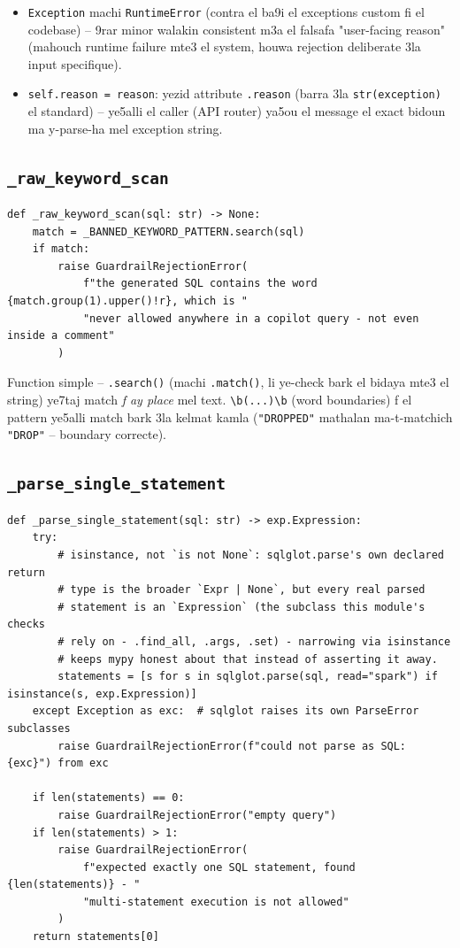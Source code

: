 \documentclass[11pt,a4paper]{report}
\DeclareRobustCommand{\code}[1]{\texttt{#1}}
\begin{document}
\begin{itemize}
  \item \code{Exception} machi \code{RuntimeError} (contra el ba9i el
        exceptions custom fi el codebase) -- 9rar minor walakin consistent
        m3a el falsafa "user-facing reason" (mahouch runtime failure
        mte3 el system, houwa rejection deliberate 3la input specifique).
  \item \code{self.reason = reason}: yezid attribute \code{.reason}
        (barra 3la \code{str(exception)} el standard) -- ye5alli el
        caller (API router) ya5ou el message el exact bidoun ma
        y-parse-ha mel exception string.
\end{itemize}

\subsection{\code{\_raw\_keyword\_scan}}

\begin{lstlisting}[style=pystyle]
def _raw_keyword_scan(sql: str) -> None:
    match = _BANNED_KEYWORD_PATTERN.search(sql)
    if match:
        raise GuardrailRejectionError(
            f"the generated SQL contains the word {match.group(1).upper()!r}, which is "
            "never allowed anywhere in a copilot query - not even inside a comment"
        )
\end{lstlisting}

Function simple -- \code{.search()} (machi \code{.match()}, li ye-check
bark el bidaya mte3 el string) ye7taj match \emph{f ay place} mel text.
\verb|\b(...)\b| (word boundaries) f el
pattern ye5alli match bark 3la kelmat kamla (\code{"DROPPED"} mathalan
ma-t-matchich \code{"DROP"} -- boundary correcte).

\subsection{\code{\_parse\_single\_statement}}

\begin{lstlisting}[style=pystyle]
def _parse_single_statement(sql: str) -> exp.Expression:
    try:
        # isinstance, not `is not None`: sqlglot.parse's own declared return
        # type is the broader `Expr | None`, but every real parsed
        # statement is an `Expression` (the subclass this module's checks
        # rely on - .find_all, .args, .set) - narrowing via isinstance
        # keeps mypy honest about that instead of asserting it away.
        statements = [s for s in sqlglot.parse(sql, read="spark") if isinstance(s, exp.Expression)]
    except Exception as exc:  # sqlglot raises its own ParseError subclasses
        raise GuardrailRejectionError(f"could not parse as SQL: {exc}") from exc

    if len(statements) == 0:
        raise GuardrailRejectionError("empty query")
    if len(statements) > 1:
        raise GuardrailRejectionError(
            f"expected exactly one SQL statement, found {len(statements)} - "
            "multi-statement execution is not allowed"
        )
    return statements[0]
\end{lstlisting}
\end{document}
